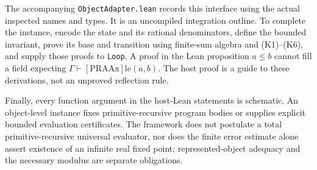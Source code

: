 The accompanying \texttt{ObjectAdapter.lean} records this interface using
the actual inspected names and types. It is an uncompiled integration
outline. To complete the instance, encode the state and its rational
denominators, define the bounded invariant, prove its base and transition
using finite-sum algebra and (K1)--(K6), and supply those proofs to
\texttt{Loop}. A proof in the Lean proposition \(a\le b\) cannot fill a
field expecting \(\Gamma\vdash[\mathrm{PRAAx}]\mathrm{le}(a,b)\).
The host proof is a guide to these derivations, not an unproved
reflection rule.

Finally, every function argument in the host-Lean statements is
schematic.  An object-level instance fixes primitive-recursive program
bodies or supplies explicit bounded evaluation certificates.  The
framework does not postulate a total primitive-recursive universal
evaluator, nor does the finite error estimate alone assert existence of
an infinite real fixed point; represented-object adequacy and the
necessary modulus are separate obligations.
